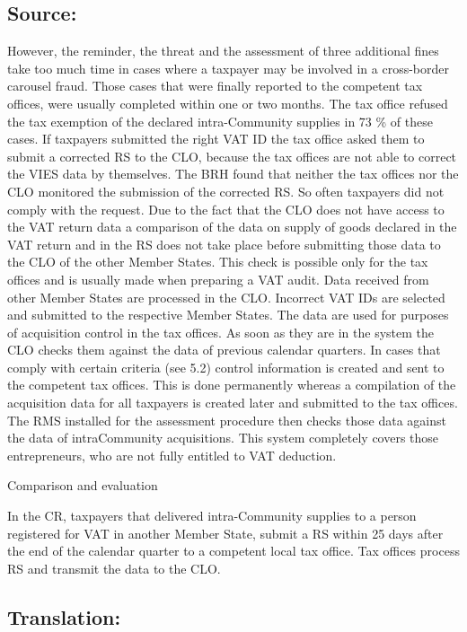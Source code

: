 \documentclass[10pt]{article}
\begin{document}
\subsection*{Source:}

However, the reminder, the threat and the assessment of three additional fines take too much time in cases where a taxpayer may be involved in a cross-border carousel fraud.
Those cases that were finally reported to the competent tax offices, were usually completed within one or two months.
The tax office refused the tax exemption of the declared intra-Community supplies in 73 \% of these cases.
If taxpayers submitted the right VAT ID the tax office asked them to submit a corrected RS to the CLO, because the tax offices are not able to correct the VIES data by themselves.
The BRH found that neither the tax offices nor the CLO monitored the submission of the corrected RS. So often taxpayers did not comply with the request.
Due to the fact that the CLO does not have access to the VAT return data a comparison of the data on supply of goods declared in the VAT return and in the RS does not take place before submitting those data to the CLO of the other Member States.
This check is possible only for the tax offices and is usually made when preparing a VAT audit.
Data received from other Member States are processed in the CLO.
Incorrect VAT IDs are selected and submitted to the respective Member States.
The data are used for purposes of acquisition control in the tax offices.
As soon as they are in the system the CLO checks them against the data of previous calendar quarters.
In cases that comply with certain criteria (see 5.2) control information is created and sent to the competent tax offices.
This is done permanently whereas a compilation of the acquisition data for all taxpayers is created later and submitted to the tax offices.
The RMS installed for the assessment procedure then checks those data against the data of intraCommunity acquisitions.
This system completely covers those entrepreneurs, who are not fully entitled to VAT deduction.


Comparison and evaluation

In the CR, taxpayers that delivered intra-Community supplies to a person registered for VAT in another Member State, submit a RS within 25 days after the end of the calendar quarter to a competent local tax office.
Tax offices process RS and transmit the data to the CLO.


\pagebreak

\subsection*{Translation:}
\end{document}
